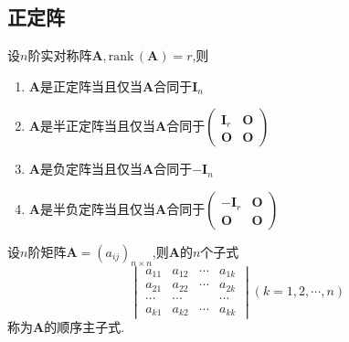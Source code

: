 \subsection{正定阵}
\begin{formal}
    \begin{theorem}[正定阵与负定阵的刻画]\label{thm:正定阵与负定阵的刻画}
        设$n$阶实对称阵$\bm{A},\mathrm{rank}\,\left(\bm{A}\right)=r$,则\begin{enumerate}[label={\textup{(\arabic*)}}]
            \item $\bm{A}$是正定阵当且仅当$\bm{A}$合同于$\bm{I}_n$
            \item $\bm{A}$是半正定阵当且仅当$\bm{A}$合同于$\begin{pmatrix}
                \bm{I}_r&\bm{O}\\
                \bm{O}&\bm{O}
            \end{pmatrix}$
            \item $\bm{A}$是负定阵当且仅当$\bm{A}$合同于$-\bm{I}_n$
            \item $\bm{A}$是半负定阵当且仅当$\bm{A}$合同于$\begin{pmatrix}
                -\bm{I}_r&\bm{O}\\
                \bm{O}&\bm{O}
            \end{pmatrix}$
        \end{enumerate}
    \end{theorem}
\end{formal}
\begin{formal}
    \begin{definition}[顺序主子式]\label{def:顺序主子式}
        设$n$阶矩阵$\bm{A}=\left(a_{ij}\right)_{n\times n}$,则$\bm{A}$的$n$个子式\[
        \begin{vmatrix}
            a_{11}&a_{12}&\cdots&a_{1k}\\
            a_{21}&a_{22}&\cdots&a_{2k}\\
            \cdots&\cdots&&\cdots\\
            a_{k1}&a_{k2}&\cdots&a_{kk}
        \end{vmatrix}\left(k=1,2,\cdots,n\right)
        \]称为$\bm{A}$的顺序主子式.
    \end{definition}
\end{formal}
